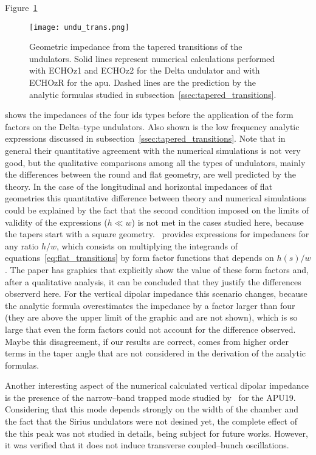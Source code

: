     Figure~\ref{fig:undu_trans}
    \begin{figure}
        \centering
        \texttt{[image: undu\_trans.png]}
        \caption{Geometric impedance from the tapered transitions of the undulators. Solid lines represent numerical calculations performed with ECHOz1 and ECHOz2 for the Delta undulator and with ECHOzR for the \gls{apu}. Dashed lines are the prediction by the analytic formulas studied in subsection~\ref{ssec:tapered_transitions}.}
        \label{fig:undu_trans}
    \end{figure}
    shows the impedances of the four \glspl{id} types before the application of the form factors on the Delta--type undulators. Also shown is the low frequency analytic expressions discussed in subsection~\ref{ssec:tapered_transitions}. Note that in general their quantitative agreement with the numerical simulations is not very good, but the qualitative comparisons among all the types of undulators, mainly the differences between the round and flat geometry, are well predicted by the theory. In the case of the longitudinal and horizontal impedances of flat geometries this quantitative difference between theory and numerical simulations could be explained by the fact that the second condition imposed on the limits of validity of the expressions ($h\ll w$) is not met in the cases studied here, because the tapers start with a square geometry.~ provides expressions for impedances for any ratio $h/w$, which consists on multiplying the integrands of equations~\eqref{eq:flat_transitions} by form factor functions that depends on $h(s)/w$. The paper has graphics that explicitly show the value of these form factors and, after a qualitative analysis, it can be concluded that they justify the differences observerd here. For the vertical dipolar impedance this scenario changes, because the analytic formula overestimates the impedance by a factor larger than four (they are above the upper limit of the graphic and are not shown), which is so large that even the form factors could not account for the difference observed. Maybe this disagreement, if our results are correct, comes from higher order terms in the taper angle that are not considered in the derivation of the analytic formulas.

    Another interesting aspect of the numerical calculated vertical dipolar impedance is the presence of the narrow--band trapped mode studied by~ for the APU19. Considering that this mode depends strongly on the width of the chamber and the fact that the Sirius undulators were not desined yet, the complete effect of the this peak was not studied in details, being subject for future works. However, it was verified that it does not induce transverse coupled--bunch oscillations.

